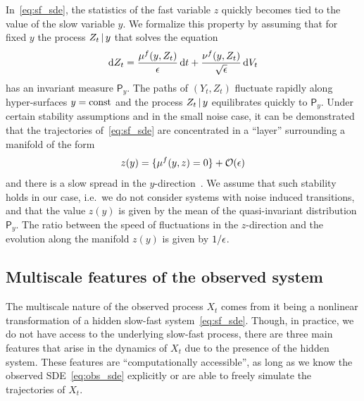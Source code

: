 \documentclass{article}
\newcommand{\invm}{\mathsf{P}} %
\begin{document}
In~\eqref{eq:sf_sde}, the statistics of the fast variable $z$ quickly becomes tied to the value of the slow variable $y$. We formalize this property by assuming that for fixed $y$ the process $Z_t\operatorname{|} y$ that solves the equation
\begin{equation*}
    \operatorname{d}\!{Z_t} = \frac{\mu^f(y, Z_t)}{\epsilon}\operatorname{d}\!{t} + \frac{\nu^f(y, Z_t)}{\sqrt{\epsilon}}\operatorname{d}\!{V_t}
\end{equation*}
has an invariant measure $\invm_{\!y}$. The paths of $(Y_t,Z_t)$ fluctuate rapidly along hyper-surfaces $y=\mathrm{const}$ and the process $Z_t\operatorname{|} y$ equilibrates quickly to $\invm_{\!y}$. Under certain stability assumptions and in the small noise case, it can be demonstrated that the trajectories of~\eqref{eq:sf_sde} are concentrated in a ``layer'' surrounding a manifold of the form
\begin{equation*}
    z(y) = \{\mu^f(y,z) = 0\} +\mathcal{O}(\epsilon)
\end{equation*}
and there is a slow spread in the $y$-direction~\cite{berglund_geometric_2003}. We assume that such stability holds in our case, i.e.~we do not consider systems with noise induced transitions, and that the value $z(y)$ is given by the mean of the quasi-invariant distribution $\invm_{\!y}$. The ratio between the speed of fluctuations in the $z$-direction and the evolution along the manifold $z(y)$ is given by $1/\epsilon$.

\subsection{Multiscale features of the observed system}
\label{sec:features_obs}
The multiscale nature of the observed process $X_t$ comes from it being a nonlinear transformation of a hidden slow-fast system~\eqref{eq:sf_sde}. Though, in practice, we do not have access to the underlying slow-fast process, there are three main features that arise in the dynamics of $X_t$ due to the presence of the hidden system. These features are ``computationally accessible'', as long as we know the observed SDE~\eqref{eq:obs_sde} explicitly or are able to freely simulate the trajectories of $X_t$.
\end{document}

